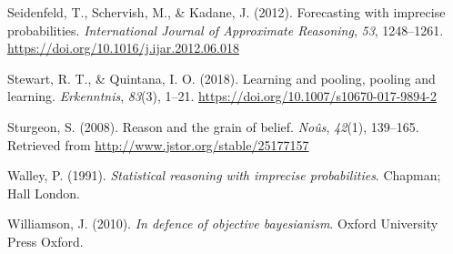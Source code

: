 \documentclass[
  10pt,
  dvipsnames,enabledeprecatedfontcommands]{scrartcl}
\newlength{\cslhangindent}
\newlength{\cslentryspacingunit} %
\newenvironment{CSLReferences}[2] %
 {%
  \setlength{\parindent}{0pt}
  \ifodd #1
  \let\oldpar\par
  \def\par{\hangindent=\cslhangindent\oldpar}
  \fi
  \setlength{\parskip}{#2\cslentryspacingunit}
 }%
 {}
\begin{document}
\begin{CSLReferences}{1}{0}
\leavevmode{}%
Seidenfeld, T., Schervish, M., \& Kadane, J. (2012). Forecasting with
imprecise probabilities. \emph{International Journal of Approximate
Reasoning}, \emph{53}, 1248--1261.
\url{https://doi.org/10.1016/j.ijar.2012.06.018}

\leavevmode{}%
Stewart, R. T., \& Quintana, I. O. (2018). Learning and pooling, pooling
and learning. \emph{Erkenntnis}, \emph{83}(3), 1--21.
\url{https://doi.org/10.1007/s10670-017-9894-2}

\leavevmode{}%
Sturgeon, S. (2008). Reason and the grain of belief. \emph{No{û}s},
\emph{42}(1), 139--165. Retrieved from
\url{http://www.jstor.org/stable/25177157}

\leavevmode{}%
Walley, P. (1991). \emph{Statistical reasoning with imprecise
probabilities}. Chapman; Hall London.

\leavevmode{}%
Williamson, J. (2010). \emph{In defence of objective bayesianism}.
Oxford University Press Oxford.

\end{CSLReferences}
\end{document}
